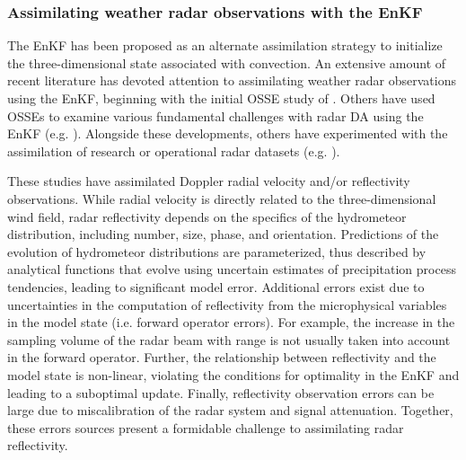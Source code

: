 \subsubsection{Assimilating weather radar observations with the EnKF}
\label{background_radarenkf}
The EnKF has been proposed as an alternate assimilation strategy to initialize the three-dimensional state associated with convection. An extensive amount of recent literature has devoted attention to assimilating weather radar observations using the EnKF, beginning with the initial OSSE study of \citet{snyderzhang03}. Others have used OSSEs to examine various fundamental challenges with radar DA using the EnKF (e.g. \citealt{zhangetal04,tongxue05,cayaetal05,xueetal06,jungetal08a,xuetal08,luxu09,thompsonetal12}). Alongside these developments, others have experimented with the assimilation of research or operational radar datasets (e.g. \citealt{dowelletal04,aksoyetal09,dowellwicker09,dowelletal11,schenkmanetal11,snooketal11,dawsonetal12,jungetal12,tanamachietal13}).

These studies have assimilated Doppler radial velocity and/or reflectivity observations. While radial velocity is directly related to the three-dimensional wind field, radar reflectivity depends on the specifics of the hydrometeor distribution, including number, size, phase, and orientation. Predictions of the evolution of hydrometeor distributions are parameterized, thus described by analytical functions that evolve using uncertain estimates of precipitation process tendencies, leading to significant model error. Additional errors exist due to uncertainties in the computation of reflectivity from the microphysical variables in the model state (i.e. forward operator errors). For example, the increase in the sampling volume of the radar beam with range is not usually taken into account in the forward operator. Further, the relationship between reflectivity and the model state is non-linear, violating the conditions for optimality in the EnKF and leading to a suboptimal update. Finally, reflectivity observation errors can be large due to miscalibration of the radar system and signal attenuation. Together, these errors sources present a formidable challenge to assimilating radar reflectivity.

